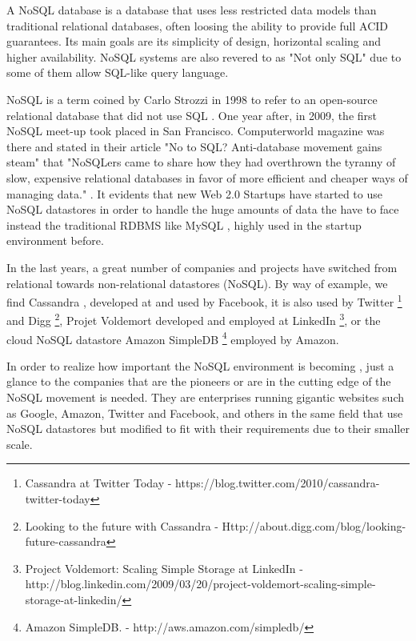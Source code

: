 \par
A NoSQL database is a database that uses less restricted data models than traditional relational databases, often loosing the ability to provide full ACID guarantees. Its main goals are its simplicity of design, horizontal scaling and higher availability. NoSQL systems are also revered to as "Not only SQL" due to some of them allow SQL-like query language.
\par
NoSQL is a term coined by Carlo Strozzi in 1998 to refer to an open-source relational database that did not use SQL \cite{Strozzi}. One year after, in 2009, the first NoSQL meet-up took placed in San Francisco. Computerworld magazine was there and stated in their article "No to SQL? Anti-database movement gains steam" that "NoSQLers came to share how they had overthrown the tyranny of slow, expensive relational databases in favor of more efficient and cheaper ways of managing data." \cite{ComputerworldNoSQL}. It evidents that new Web 2.0 Startups have started to use NoSQL datastores in order to handle the huge amounts of data the have to face instead the traditional RDBMS like MySQL \nocite{MySQL}, highly used in the startup environment before.
\par
In the last years, a great number of companies and projects have switched from relational towards non-relational datastores (NoSQL). By way of example, we find Cassandra \cite{ApacheCassandra}, developed at and used by Facebook, it is also used by Twitter \footnote{Cassandra at Twitter Today - https://blog.twitter.com/2010/cassandra-twitter-today} and Digg \footnote{Looking to the future with Cassandra - Http://about.digg.com/blog/looking-future-cassandra}, Projet Voldemort developed and employed at LinkedIn \footnote{Project Voldemort: Scaling Simple Storage at LinkedIn - http://blog.linkedin.com/2009/03/20/project-voldemort-scaling-simple-storage-at-linkedin/}, or the cloud NoSQL datastore Amazon SimpleDB \footnote{Amazon SimpleDB. -
http://aws.amazon.com/simpledb/} employed by Amazon.
\par
In order to realize how important the NoSQL environment is becoming , just a glance to the companies that are the pioneers or are in the cutting edge of the NoSQL movement is needed. They are enterprises running gigantic websites such as Google, Amazon, Twitter and Facebook, and others in the same field that use NoSQL datastores but modified to fit with their requirements due to their smaller scale.
\par



